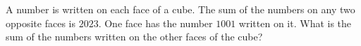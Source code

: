 A number is written on each face of a cube. The sum of the numbers on any two opposite faces is $2023$. One face has the number $1001$ written on it. What is the sum of the numbers written on the other faces of the cube?
